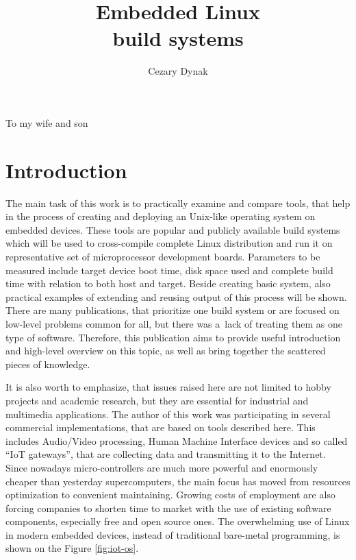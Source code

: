 \documentclass[printmode]{mgr}
\title{Embedded Linux \\ build systems}
\author{Cezary Dynak}
\begin{document}
%


\maketitle
\dedication{6cm}{To my wife and son}

\tableofcontents



















\chapter*{Introduction}

The main task of this work is to practically examine and compare tools, that help in the process of creating and deploying an Unix-like operating system on embedded devices.
These tools are popular and publicly available build systems which will be used to cross-compile complete Linux distribution and run it on representative set of microprocessor development boards.
Parameters to be measured include target device boot time, disk space used and complete build time with relation to both host and target.
Beside creating basic system, also practical examples of extending and reusing output of this process will be shown.
There are many publications, that prioritize one build system or are focused on low-level problems common for all, but there was a~lack of treating them as one type of software.
Therefore, this publication aims to provide useful introduction and high-level overview on this topic, as well as bring together the scattered pieces of knowledge.

It is also worth to emphasize, that issues raised here are not limited to hobby projects and academic research, but they are essential for industrial and multimedia applications.
The author of this work was participating in several commercial implementations, that are based on tools described here.
This includes Audio/Video processing, Human Machine Interface devices and so called ``IoT gateways'', that are collecting data and transmitting it to the Internet.
Since nowadays micro-controllers are much more powerful and enormously cheaper than yesterday supercomputers, the main focus has moved from resources optimization to convenient maintaining.
Growing costs of employment are also forcing companies to shorten time to market with the use of existing software components, especially free and open source ones.
The overwhelming use of Linux in modern embedded devices, instead of traditional bare-metal programming, is shown on the Figure \ref{fig:iot-os}.
\end{document}
